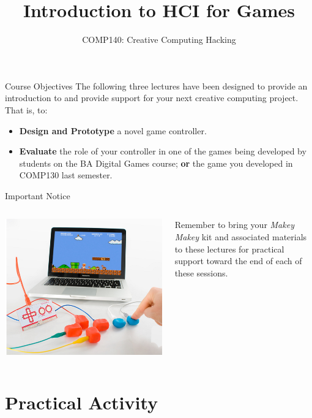 \documentclass[xcolor={dvipsnames}]{beamer}\usepackage{etoolbox}\newtoggle{printable}\togglefalse{printable}
\begin{document}
\title{Introduction to HCI for Games}   
\subtitle{COMP140: Creative Computing Hacking}

\frame{\titlepage} 

\begin{frame}{Course Objectives}
	The following three lectures have been designed to provide an introduction to and provide support for your next creative computing project.
	That is, to:
	
	\begin{itemize}
		\item \textbf{Design and Prototype} a novel game controller.
		\item \textbf{Evaluate} the role of your controller in one of the games being developed by students on the BA Digital Games course; \textbf{or}
                      the game you developed in COMP130 last semester.
	\end{itemize}
\end{frame}

\begin{frame}{Important Notice}
	\begin{columns}[onlytextwidth]
		\begin{column}{0.45\textwidth}
			\includegraphics[height=22ex]{MakeyMakey.jpg}
		\end{column}
		\begin{column}{0.45\textwidth}
			Remember to bring your \textit{Makey Makey} kit and associated materials to these lectures for practical 
			support toward the end of each of these sessions.
		\end{column}
	\end{columns}
\end{frame}







%

\part{Practical Activity}
\frame{\partpage}
\end{document}
